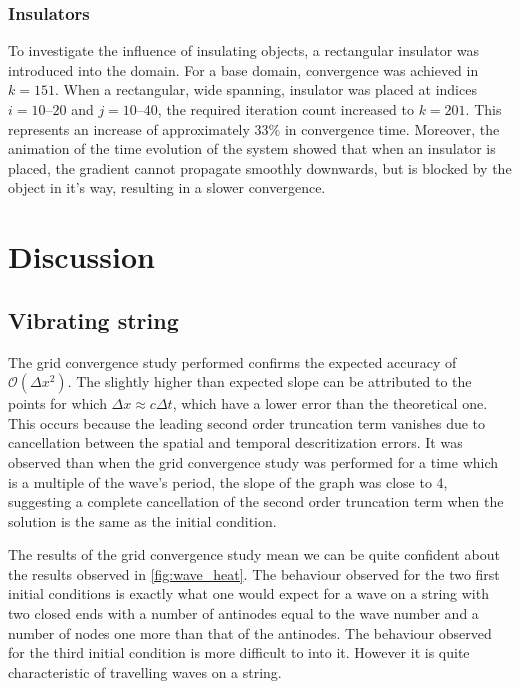 \documentclass[10pt, journal]{IEEEtran}
\begin{document}
    
        \subsubsection{Insulators}
         To investigate the influence of insulating objects, a rectangular insulator was introduced into the domain. For a base domain, convergence was achieved in $k=151$. When a rectangular, wide spanning, insulator was placed at indices $i=10$--$20$ and $j=10$--$40$, the required iteration count increased to $k=201$. This represents an increase of approximately $33\%$ in convergence time. Moreover, the animation of the time evolution of the system showed that when an insulator is placed, the gradient cannot propagate smoothly downwards, but is blocked by the object in it's way, resulting in a slower convergence.  


\section{Discussion}

    \subsection{Vibrating string}
        The grid convergence study performed confirms the expected accuracy of $\mathcal{O}(\Delta x^2)$. The slightly higher than expected slope can be attributed to the points for which $\Delta x \approx c \Delta t $, which have a lower error than the theoretical one. This occurs because the leading second order truncation term vanishes due to cancellation between the spatial and temporal descritization errors. It was observed than when the grid convergence study was performed for a time which is a multiple of the wave's period, the slope of the graph was close to 4, suggesting a complete cancellation of the second order truncation term when the solution is the same as the initial condition.

        The results of the grid convergence study mean we can be quite confident about the results observed in \cref{fig:wave_heat}. The behaviour observed for the two first initial conditions is exactly what one would expect for a wave on a string with two closed ends with a number of antinodes equal to the wave number and a number of nodes one more than that of the antinodes. The behaviour observed for the third initial condition is more difficult to into it. However it is  quite characteristic of travelling waves on a string. 
\end{document}
